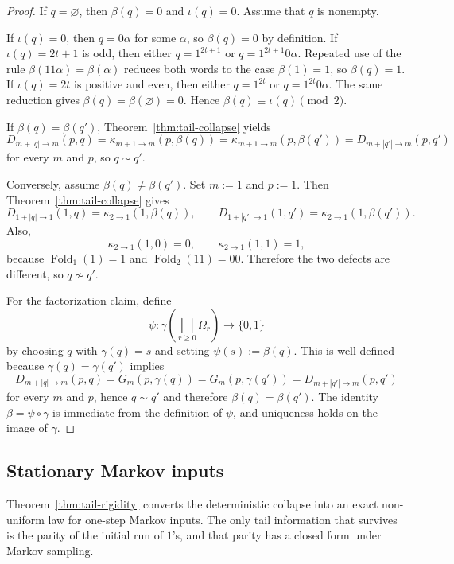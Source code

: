 \documentclass[11pt,reqno]{amsart}
\numberwithin{equation}{section}
\theoremstyle{plain}
\theoremstyle{definition}
\theoremstyle{remark}
\DeclareMathOperator{\Fold}{Fold}
\begin{document}
\begin{proof}
If $q=\varnothing$, then $\beta(q)=0$ and $\iota(q)=0$.  Assume that $q$ is
nonempty.

If $\iota(q)=0$, then $q=0\alpha$ for some $\alpha$, so $\beta(q)=0$ by
definition.  If $\iota(q)=2t+1$ is odd, then either $q=1^{2t+1}$ or
$q=1^{2t+1}0\alpha$.  Repeated use of the rule $\beta(11\alpha)=\beta(\alpha)$
reduces both words to the case $\beta(1)=1$, so $\beta(q)=1$.  If
$\iota(q)=2t$ is positive and even, then either $q=1^{2t}$ or
$q=1^{2t}0\alpha$.  The same reduction gives
$\beta(q)=\beta(\varnothing)=0$.  Hence $\beta(q)\equiv\iota(q)\pmod 2$.

If $\beta(q)=\beta(q')$, Theorem~\ref{thm:tail-collapse} yields
\[
D_{m+|q|\to m}(p,q)
=
\kappa_{m+1\to m}(p,\beta(q))
=
\kappa_{m+1\to m}(p,\beta(q'))
=
D_{m+|q'|\to m}(p,q')
\]
for every $m$ and $p$, so $q\sim q'$.

Conversely, assume $\beta(q)\ne\beta(q')$.  Set $m:=1$ and $p:=1$.  Then
Theorem~\ref{thm:tail-collapse} gives
\[
D_{1+|q|\to 1}(1,q)=\kappa_{2\to 1}(1,\beta(q)),
\qquad
D_{1+|q'|\to 1}(1,q')=\kappa_{2\to 1}(1,\beta(q')).
\]
Also,
\[
\kappa_{2\to 1}(1,0)=0,
\qquad
\kappa_{2\to 1}(1,1)=1,
\]
because $\Fold_1(1)=1$ and $\Fold_2(11)=00$.  Therefore the two defects are
different, so $q\nsim q'$.

For the factorization claim, define
\[
\psi:\gamma\!\left(\bigsqcup_{r\ge 0}\Omega_r\right)\to\{0,1\}
\]
by choosing $q$ with $\gamma(q)=s$ and setting $\psi(s):=\beta(q)$.  This is
well defined because
$\gamma(q)=\gamma(q')$ implies
\[
D_{m+|q|\to m}(p,q)=G_m(p,\gamma(q))=G_m(p,\gamma(q'))=D_{m+|q'|\to m}(p,q')
\]
for every $m$ and $p$, hence $q\sim q'$ and therefore $\beta(q)=\beta(q')$.
The identity $\beta=\psi\circ\gamma$ is immediate from the definition of
$\psi$, and uniqueness holds on the image of $\gamma$.
\end{proof}

\subsection{Stationary Markov inputs}

Theorem~\ref{thm:tail-rigidity} converts the deterministic collapse into an
exact non-uniform law for one-step Markov inputs.  The only tail information
that survives is the parity of the initial run of $1$'s, and that parity has
a closed form under Markov sampling.
\end{document}
